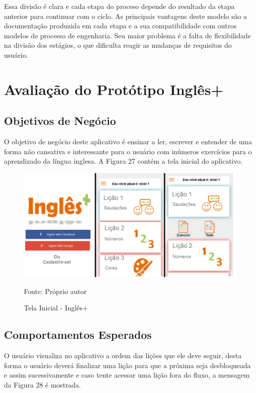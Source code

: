 \documentclass[
	12pt,				%
	openany,			%
	oneside,			%
	a4paper,			%
	english,			%
	french,				%
	spanish,			%
	brazil				%
	]{abntex2}
\begin{document}
Essa divisão é clara e cada etapa do proceso depende do resultado da etapa anterior para continuar com o ciclo.
As principais vantagens deste modelo são a documentação produzida em cada etapa e a sua compatibilidade com outros modelos de processo de engenharia. Seu maior problema é a falta de flexibilidade na divisão dos estágios, o que dificulta reagir as mudanças de requisitos do usuário.


\section{Avaliação do Protótipo Inglês+}
\subsection{Objetivos de Negócio}
O objetivo de negócio deste aplicativo é ensinar a ler, escrever e entender de uma forma não cansativa e interessante para o usuário com inúmeros exercícios para o aprendizado da língua inglesa. A Figura 27 contém a tela inicial do aplicativo.

\begin{figure}[H]
    \centering
\caption{Tela Inicial - Inglês+}
\includegraphics[width=12cm]{figuras/inicial-ingles+.png}
\par
 Fonte: Próprio autor
\end{figure}


\subsection{Comportamentos Esperados}
O usuário visualiza no aplicativo a ordem das lições que ele deve seguir, desta forma o usuário deverá finalizar uma lição para que a próxima seja desbloqueada e assim sucessivamente e caso tente acessar uma lição fora do fluxo, a mensagem da Figura 28 é mostrada.
\end{document}
